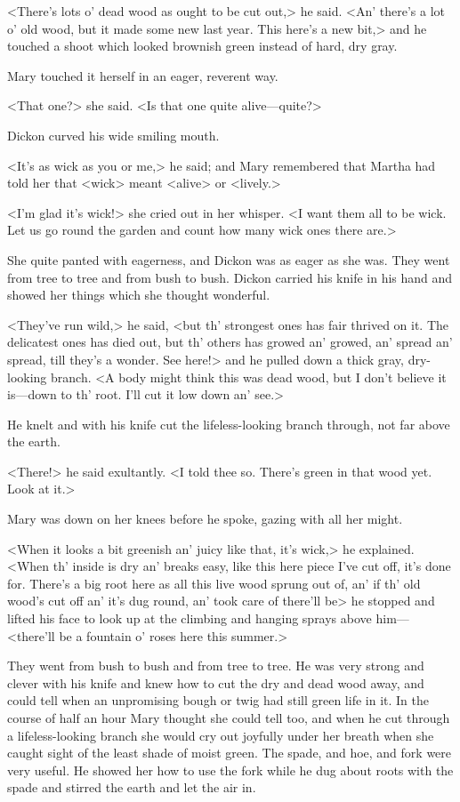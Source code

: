 <There's lots o' dead wood as ought to be cut out,> he said. <An' there's a lot o' old wood, but it made some new last year. This here's a new bit,> and he touched a shoot which looked brownish green instead of hard, dry gray.

Mary touched it herself in an eager, reverent way.

<That one?> she said. <Is that one quite alive—quite?>

Dickon curved his wide smiling mouth.

<It's as wick as you or me,> he said; and Mary remembered that Martha had told her that <wick> meant <alive> or <lively.>

<I'm glad it's wick!> she cried out in her whisper. <I want them all to be wick. Let us go round the garden and count how many wick ones there are.>

She quite panted with eagerness, and Dickon was as eager as she was. They went from tree to tree and from bush to bush. Dickon carried his knife in his hand and showed her things which she thought wonderful.

<They've run wild,> he said, <but th' strongest ones has fair thrived on it. The delicatest ones has died out, but th' others has growed an' growed, an' spread an' spread, till they's a wonder. See here!> and he pulled down a thick gray, dry-looking branch. <A body might think this was dead wood, but I don't believe it is—down to th' root. I'll cut it low down an' see.>

He knelt and with his knife cut the lifeless-looking branch through, not far above the earth.

<There!> he said exultantly. <I told thee so. There's green in that wood yet. Look at it.>

Mary was down on her knees before he spoke, gazing with all her might.

<When it looks a bit greenish an' juicy like that, it's wick,> he explained. <When th' inside is dry an' breaks easy, like this here piece I've cut off, it's done for. There's a big root here as all this live wood sprung out of, an' if th' old wood's cut off an' it's dug round, an' took care of there'll be\longdash> he stopped and lifted his face to look up at the climbing and hanging sprays above him—<there'll be a fountain o' roses here this summer.>

They went from bush to bush and from tree to tree. He was very strong and clever with his knife and knew how to cut the dry and dead wood away, and could tell when an unpromising bough or twig had still green life in it. In the course of half an hour Mary thought she could tell too, and when he cut through a lifeless-looking branch she would cry out joyfully under her breath when she caught sight of the least shade of moist green. The spade, and hoe, and fork were very useful. He showed her how to use the fork while he dug about roots with the spade and stirred the earth and let the air in.

